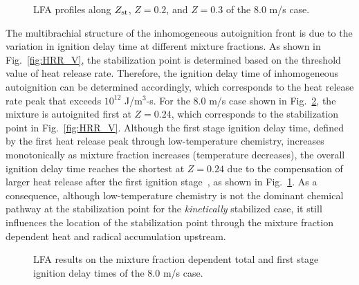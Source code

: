 \begin{figure}
  \vspace{-1in}
  \centering
  \scriptsize
  
  
  
  
  
  \normalsize
  \caption{LFA profiles along $Z_{\rm st}$, $Z = 0.2$, and $Z = 0.3$ of the $8.0$ m/s case.}
  \label{fig:1D_V}
\end{figure}

The multibrachial structure of the inhomogeneous autoignition front is due to the variation in ignition delay time at different mixture fractions.  As shown in Fig.~\ref{fig:HRR_V}, the stabilization point is determined based on the threshold value of heat release rate.  Therefore, the ignition delay time of inhomogeneous autoignition can be determined accordingly, which corresponds to the heat release rate peak that exceeds $10^{12}$ J/m$^3$-s.  For the $8.0$ m/s case shown in Fig.~\ref{fig:tau}, the mixture is autoignited first at $Z = 0.24$, which corresponds to the stabilization point in Fig.~\ref{fig:HRR_V}.  Although the first stage ignition delay time, defined by the first heat release peak through low-temperature chemistry, increases monotonically as mixture fraction increases (temperature decreases), the overall ignition delay time reaches the shortest at $Z = 0.24$ due to the compensation of larger heat release after the first ignition stage~\cite{law12}, as shown in Fig.~\ref{fig:1D_V}.  As a consequence, although low-temperature chemistry is not the dominant chemical pathway at the stabilization point for the \emph{kinetically} stabilized case, it still influences the location of the stabilization point through the mixture fraction dependent heat and radical accumulation upstream.   

\begin{figure}
  \centering
  \scriptsize
  \resizebox{0.6\textwidth}{!}{}
  \resizebox{0.6\textwidth}{!}{}
  \normalsize
  \caption{LFA results on the mixture fraction dependent total and first stage ignition delay times of the $8.0$ m/s case.}
  \label{fig:tau}
\end{figure}          

